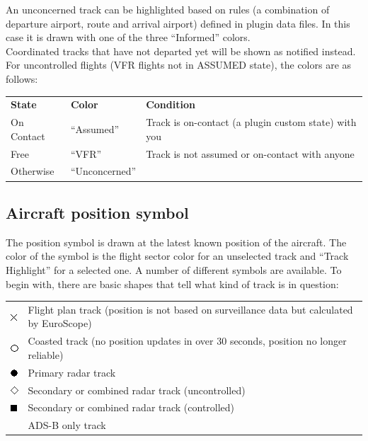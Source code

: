 \documentclass[11pt,a4paper]{memoir}
\begin{document}
An unconcerned track can be highlighted based on rules (a combination of departure airport, route and
arrival airport) defined in plugin data files. In this case it is drawn with one of the three “Informed” colors.\\

Coordinated tracks that have not departed yet will be shown as notified instead.\\

For uncontrolled flights (VFR flights not in ASSUMED state), the colors are as follows:\\
\begin{tabular}{l l l}
\textbf{State}  & \textbf{Color}    & \textbf{Condition}
\\On Contact    & “Assumed”         & Track is on-contact (a plugin custom state) with you
\\Free          & “VFR”             & Track is not assumed or on-contact with anyone
\\Otherwise     & “Unconcerned”     &
\end{tabular}

\subsection{Aircraft position symbol}
The position symbol is drawn at the latest known position of the aircraft. The color of the symbol is the
flight sector color for an unselected track and “Track Highlight” for a selected one. A number of different
symbols are available. To begin with, there are basic shapes that tell what kind of track is in question:

\begin{tabular}{l l}
\includegraphics{img/rps_fpasd.png} & Flight plan track (position is not based on surveillance data but calculated by EuroScope)
\\\includegraphics{img/rps_coast.png} & Coasted track (no position updates in over 30 seconds, position no longer reliable)
\\\includegraphics{img/rps_psr.png} & Primary radar track
\\\includegraphics{img/rps_sec.png} & Secondary or combined radar track (uncontrolled)
\\\includegraphics{img/rps_psr+ssr.png} & Secondary or combined radar track (controlled)
\\ & ADS-B only track
\end{tabular}
\end{document}
